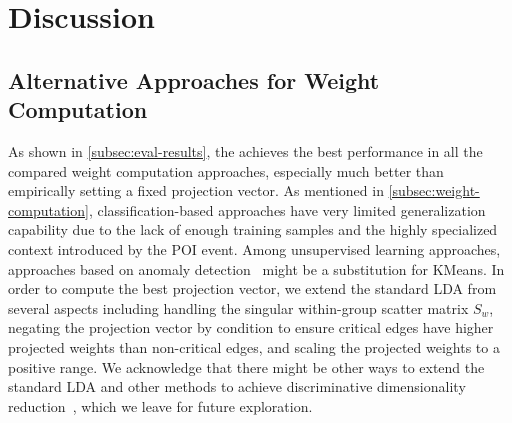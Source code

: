 \section{Discussion}

\subsection{Alternative Approaches for Weight Computation}

As shown in \cref{subsec:eval-results}, the \tool achieves the best performance in all the compared weight computation approaches, especially much better than empirically setting a fixed projection vector. As mentioned in \cref{subsec:weight-computation}, classification-based approaches have very limited generalization capability due to the lack of enough training samples and the highly specialized context introduced by the POI event.
Among unsupervised learning approaches, approaches based on anomaly detection~\cite{anomalysurvey} might be a substitution for KMeans.
In order to compute the best projection vector, we extend the standard LDA from several aspects including handling the singular within-group scatter matrix $S_w$, negating the projection vector by condition to ensure critical edges have higher projected weights than non-critical edges, and scaling the projected weights to a positive range.
%
We acknowledge that there might be other ways to extend the standard LDA and other methods to achieve discriminative dimensionality reduction~\cite{Mika99fisherdiscriminant,sugiyama2006local}, which we leave for future exploration.



